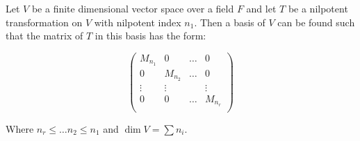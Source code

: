 \begin{theorem}\label{3.4.12}
    Let $V$ be a finite dimensional vector space over a field  $F$ and let  $T$
    be a nilpotent transformation on  $V$ with nilpotent index $n_1$. Then a
    basis of $V$ can be found such that the matrix of  $T$ in this basis has
    the form:

    \begin{equation}
        \begin{pmatrix}
            M_{n_1}     &   0   & \dots &   0   \\
            0       &   M_{n_2} &   \dots   &   0   \\
            \vdots  &   \vdots  &   &   \vdots  \\
            0       &   0   &   \dots   &   M_{n_r} \\
        \end{pmatrix}
    \end{equation}

    Where $n_r \leq \dots n_2 \leq n_1$ and $\dim{V}=\sum{n_i}$.
\end{theorem}
